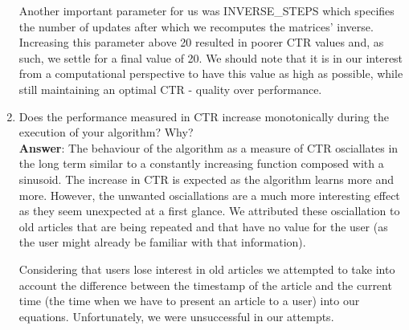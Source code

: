 \documentclass[11pt]{article}
\begin{document}
\begin{enumerate}
Another important parameter for us was INVERSE\_STEPS which specifies the
number of updates after which we recomputes the matrices' inverse. Increasing
this parameter above 20 resulted in poorer CTR values and, as such, we settle
for a final value of 20. We should note that it is in our interest from a
 computational perspective to have this value as high as possible, while still
 maintaining an optimal CTR - quality over performance.

\item Does the performance measured in CTR increase monotonically during the
execution of your algorithm? Why? \\
\textbf{Answer}:
The behaviour of the algorithm as a measure of CTR osciallates in the long term
similar to a constantly increasing function composed with a sinusoid. The
increase in CTR is expected as the algorithm learns more and more. However, the
unwanted osciallations are a much more interesting effect as they seem unexpected
at a first glance. We attributed these osciallation to old articles that are
being repeated and that have no value for the user (as the user might already
be familiar with that information).

Considering that users lose interest in old articles we attempted to take into
account the difference between the timestamp of the article and the current
time (the time when we have to present an article to a user) into our equations.
Unfortunately, we were unsuccessful in our attempts.

\end{enumerate}
\end{document}
